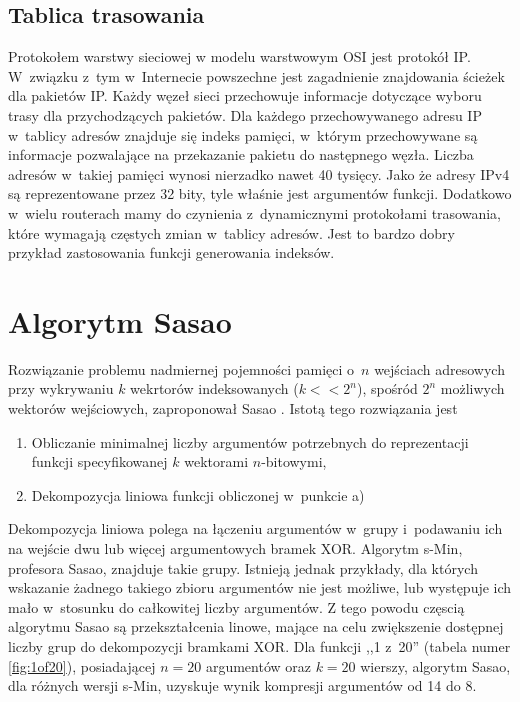 \subsection{Tablica trasowania}
Protokołem warstwy sieciowej w modelu warstwowym OSI jest protokół IP.
W~związku z~tym w~Internecie powszechne jest zagadnienie znajdowania ścieżek dla pakietów IP.
Każdy węzeł sieci przechowuje informacje dotyczące wyboru trasy dla przychodzących pakietów.
Dla każdego przechowywanego adresu IP w~tablicy adresów znajduje się indeks pamięci,
w~którym przechowywane są informacje pozwalające na przekazanie pakietu do następnego węzła.
Liczba adresów w~takiej pamięci wynosi nierzadko nawet 40 tysięcy.
Jako że adresy IPv4 są reprezentowane przez 32 bity, tyle właśnie jest argumentów funkcji.
Dodatkowo w~wielu routerach mamy do czynienia z~dynamicznymi protokołami trasowania,
które wymagają częstych zmian w~tablicy adresów.
Jest to bardzo dobry przykład zastosowania funkcji generowania indeksów.

\section{Algorytm Sasao}
Rozwiązanie problemu nadmiernej pojemności pamięci o~$n$ wejściach adresowych przy wykrywaniu $k$ wekrtorów indeksowanych ($k<<2^n$),
spośród $2^n$ możliwych wektorów wejściowych,
zaproponował Sasao \cite{sasao-workshop, sasao-recent, sasao-s-min, sasao-synthesis}.
Istotą tego rozwiązania jest
\begin{enumerate}[label=\alph*)]
\item Obliczanie minimalnej liczby argumentów potrzebnych do reprezentacji funkcji specyfikowanej $k$ wektorami $n$-bitowymi,
\item Dekompozycja liniowa funkcji obliczonej w~punkcie a)
\end{enumerate}

Dekompozycja liniowa polega na łączeniu argumentów w~grupy i~podawaniu ich na wejście dwu lub więcej argumentowych bramek XOR.
Algorytm s-Min, profesora Sasao, znajduje takie grupy.
Istnieją jednak przykłady,
dla których wskazanie żadnego takiego zbioru argumentów nie jest możliwe,
lub występuje ich mało w~stosunku do całkowitej liczby argumentów.
Z tego powodu częscią algorytmu Sasao są przekształcenia linowe,
mające na celu zwiększenie dostępnej liczby grup do dekompozycji bramkami XOR.
Dla funkcji ,,1 z~20'' (tabela numer \ref{fig:1of20}),
posiadającej $n=20$ argumentów oraz $k=20$ wierszy,
algorytm Sasao,
dla różnych wersji s-Min,
uzyskuje wynik kompresji argumentów od 14 do 8.

